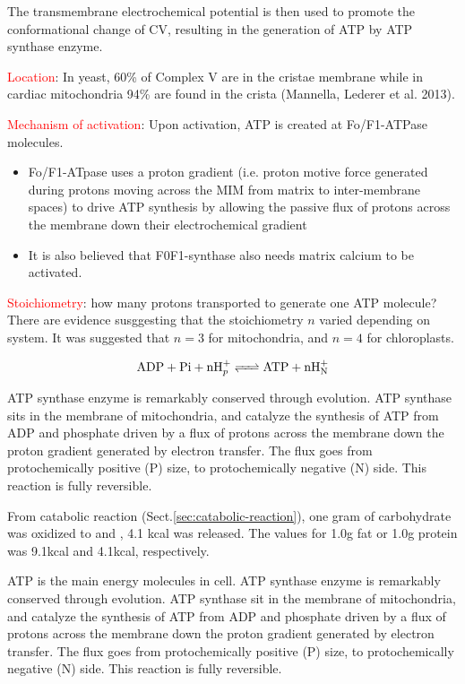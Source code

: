 The transmembrane electrochemical potential is then used to promote the
conformational change of CV, resulting in the generation of ATP by ATP synthase
enzyme.

\textcolor{red}{Location}: In yeast, 60\% of Complex V are in the cristae
membrane while in cardiac mitochondria 94\% are found in the crista (Mannella,
Lederer et al. 2013).

\textcolor{red}{Mechanism of activation}: Upon activation, ATP is created at
Fo/F1-ATPase molecules.
\begin{itemize}
  \item  Fo/F1-ATpase uses a proton gradient (i.e. proton motive force
  generated during protons moving across the MIM from matrix to inter-membrane
  spaces) to drive ATP synthesis by allowing the passive flux of protons across
  the membrane down their electrochemical  gradient
  
  \item It is also believed that F0F1-synthase also needs matrix calcium to be
  activated.
\end{itemize}

\textcolor{red}{Stoichiometry}: how many protons transported to generate one ATP
molecule? There are evidence susggesting that the stoichiometry $n$ varied depending on
system. It was suggested that $n=3$ for mitochondria, and $n=4$ for
chloroplasts.

\begin{equation}
\ce{ADP + Pi + nH^+_p <=> ATP + nH^+_N}
\end{equation}

ATP synthase enzyme is remarkably conserved through evolution. ATP synthase sits
in the membrane of mitochondria, and catalyze the synthesis of ATP from ADP and
phosphate driven by a flux of protons across the membrane down the proton
gradient generated by electron transfer. The flux goes from protochemically
positive (P) size, to protochemically negative (N) side. This reaction is fully
reversible.

From catabolic reaction (Sect.\ref{sec:catabolic-reaction}), one gram of
carbohydrate was oxidized to  and , 4.1 kcal was released. The
values for 1.0g fat or 1.0g protein was 9.1kcal and 4.1kcal, respectively.

ATP is the main energy molecules in cell. ATP synthase enzyme is remarkably
conserved through evolution. ATP synthase sit in the membrane of mitochondria,
and catalyze the synthesis of ATP from ADP and phosphate driven by a flux of
protons across the membrane down the proton gradient generated by electron
transfer. The flux goes from protochemically positive (P) size, to
protochemically negative (N) side. This reaction is fully reversible.

